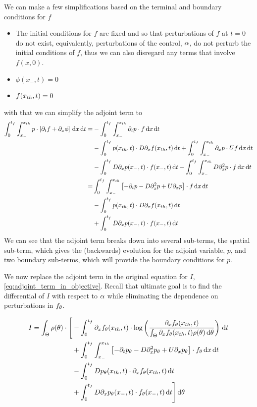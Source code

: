 \documentclass{article}
\begin{document}
We can make a few simplifications based on the terminal and boundary
conditions for $f$
\begin{itemize}
  \item The initial conditions for $f$ are fixed and so that perturbations of
  $f$ at $t=0$ do not exist, equivalently, perturbations of the  control, ${\alpha}$,
  do not perturb the initial conditions of $f$, thus we can also disregard any
  terms that involve $f(x,0)$.
  \item $\phi(x_-, t)=0$
  \item $f({ x_{th} }, t) = 0$ 
\end{itemize}
with that we can simplify the adjoint term to 
\def \tf {{t_f}}
\begin{align*}
\int_0^{\tf} \int_{x_-}^{\xth}
p \cdot \left[\di_t f  + \di_x \phi\right]
	\intd{x}\intd{t} 
=&
-\int_0^{\tf}\int_{x_-}^{\xth} \di_tp \cdot  f \intd{x}\intd{t}  
\\ 
&- \int_{0}^{\tf} p(\xth,t) \cdot D\di_xf(\xth,t) \intd{t}
 + \int_0^{\tf}\int_{x_-}^{\xth} \di_xp \cdot  U f\intd{x}\intd{t}
\\
&- \int_{0}^{\tf} D\di_xp(x_-,t) \cdot f(x_-,t) \intd{t} 
 - \int_0^{\tf}\int_{x_-}^{\xth} D\di^2_xp \cdot  f\intd{x}\intd{t}
\\
=&
\int_0^{\tf}\int_{x_-}^{\xth} 
	\left[-\di_tp -  D\di^2_xp + U \di_xp \right]\cdot  f
\intd{x}\intd{t}
\\ 
&- \int_{0}^{\tf} p(\xth,t) \cdot D\di_xf(\xth,t) \intd{t}
\\
& + \int_{0}^{\tf} D\di_xp(x_-,t) \cdot f(x_-,t) \intd{t}
\end{align*}
We can see that the adjoint term breaks down into several sub-terms, the spatial
sub-term, which gives the (backwards) evolution for the adjoint variable, $p$,
and two boundary sub-terms, which will provide the boundary conditions for $p$. 

We now replace the adjoint term in the original equation for $I$,
\cref{eq:adjoint_term_in_objective}. Recall that ultimate goal is to find the
differential of $I$ with respect to ${\alpha}$ while eliminating the
dependence on perturbations in $f_{\theta}$. 

\begin{align*}
I=  
\int_\Theta  \rho(\th)\cdot \Bigg[ 
&-\int_0^{\tf} 
	  \di_xf_\th(\xth, t)  \cdot 
		\log \left( \frac{\di_xf_\th(\xth, t)}
						{\int_\Theta \di_xf_\th(\xth, t)\rho(\th)\intd{\th} } \right)
\intd{t} 
\\ &+
\int_0^{\tf}\int_{x_-}^{\xth} 
	\left[-\di_tp_\th -  D\di^2_xp_\th + U \di_xp_\th \right]\cdot  f_\th
\intd{x}\intd{t}
\\ 
&- \int_{0}^{\tf} D p_\th(\xth,t) \cdot \di_xf_\th(\xth,t) \intd{t}
\\
& + \int_{0}^{\tf} D\di_xp_\th(x_-,t) \cdot f_\th(x_-,t) \intd{t}
\Bigg]				\intd{\th}	   
\end{align*}
\end{document}
